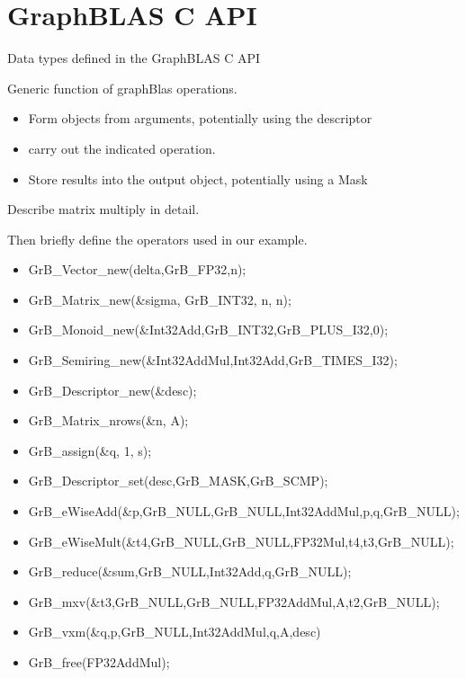 \section{GraphBLAS C API}
\label{sec:Capi}
Data types defined in the GraphBLAS C API

Generic function of graphBlas operations.
\begin{itemize}
\item Form objects from arguments, potentially using the descriptor
\item carry out the indicated operation.
\item Store results into the output object, potentially using a Mask
\end{itemize}
Describe matrix multiply in detail.  

Then briefly define the operators used in our example.
\begin{itemize}
\item GrB\_Vector\_new(delta,GrB\_FP32,n);
\item GrB\_Matrix\_new(\&sigma, GrB\_INT32, n, n);
\item GrB\_Monoid\_new(\&Int32Add,GrB\_INT32,GrB\_PLUS\_I32,0);
\item GrB\_Semiring\_new(\&Int32AddMul,Int32Add,GrB\_TIMES\_I32);
\item GrB\_Descriptor\_new(\&desc);
\item GrB\_Matrix\_nrows(\&n, A);
\item GrB\_assign(\&q, 1, s);
\item GrB\_Descriptor\_set(desc,GrB\_MASK,GrB\_SCMP);
\item GrB\_eWiseAdd(\&p,GrB\_NULL,GrB\_NULL,Int32AddMul,p,q,GrB\_NULL);
\item GrB\_eWiseMult(\&t4,GrB\_NULL,GrB\_NULL,FP32Mul,t4,t3,GrB\_NULL);
\item GrB\_reduce(\&sum,GrB\_NULL,Int32Add,q,GrB\_NULL);	
\item GrB\_mxv(\&t3,GrB\_NULL,GrB\_NULL,FP32AddMul,A,t2,GrB\_NULL);
\item GrB\_vxm(\&q,p,GrB\_NULL,Int32AddMul,q,A,desc)
\item GrB\_free(FP32AddMul); 
\end{itemize}
